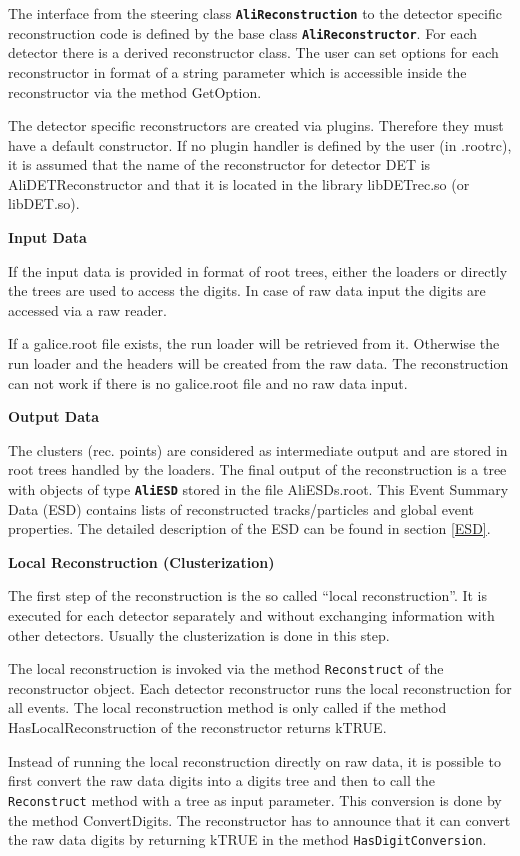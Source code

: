 \documentclass[12pt,a4paper,twoside]{article}
\newcommand{\class}[1]{\texttt{\textbf{#1}}\xspace}
\newcommand{\method}[1]{\texttt{#1}\xspace}
\begin{document}
The interface from the steering class \class{AliReconstruction} to the
detector specific reconstruction code is defined by the base class
\class{AliReconstructor}. For each detector there is a derived reconstructor
class. The user can set options for each reconstructor in format of a
string parameter which is accessible inside the reconstructor via the
method GetOption. 

The detector specific reconstructors are created via
plugins. Therefore they must have a default constructor. If no plugin
handler is defined by the user (in .rootrc), it is assumed that the
name of the reconstructor for detector DET is AliDETReconstructor and
that it is located in the library libDETrec.so (or libDET.so).

\noindent
\textbf{Input Data}

If the input data is provided in format of root trees, either the
loaders or directly the trees are used to access the digits. In case
of raw data input the digits are accessed via a raw reader. 

If a galice.root file exists, the run loader will be retrieved from
it. Otherwise the run loader and the headers will be created from the
raw data. The reconstruction can not work if there is no galice.root file
and no raw data input.

\noindent
\textbf{Output Data}

The clusters (rec. points) are considered as intermediate output and
are stored in root trees handled by the loaders. The final output of
the reconstruction is a tree with objects of type \class{AliESD} stored in the
file AliESDs.root. This Event Summary Data (ESD) contains lists of
reconstructed tracks/particles and global event properties. The detailed
description of the ESD can be found in section \ref{ESD}.

\noindent
\textbf{Local Reconstruction (Clusterization)}

The first step of the reconstruction is the so called ``local
reconstruction''. It is executed for each detector separately and
without exchanging information with other detectors. Usually the
clusterization is done in this step. 

The local reconstruction is invoked via the method \method{Reconstruct} of the
reconstructor object. Each detector reconstructor runs the local
reconstruction for all events. The local reconstruction method is
only called if the method HasLocalReconstruction of the reconstructor
returns kTRUE. 

Instead of running the local reconstruction directly on raw data, it
is possible to first convert the raw data digits into a digits tree
and then to call the \method{Reconstruct} method with a tree as input
parameter. This conversion is done by the method ConvertDigits. The
reconstructor has to announce that it can convert the raw data digits
by returning kTRUE in the method \method{HasDigitConversion}.
\end{document}
